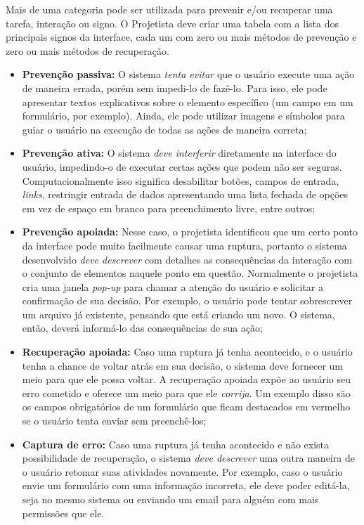 \indent Mais de uma categoria pode ser utilizada para prevenir e/ou recuperar uma tarefa, interação ou signo. O Projetista deve criar uma tabela com a lista dos principais signos da interface, cada um com zero ou mais métodos de prevenção e zero ou mais métodos de recuperação.

\begin{itemize}

\item \textbf{Prevenção passiva:} O sistema \textit{tenta evitar} que o usuário execute uma ação de maneira errada, porém sem impedi-lo de fazê-lo. Para isso, ele pode apresentar textos explicativos sobre o elemento específico (um campo em um formulário, por exemplo). Ainda, ele pode utilizar imagens e símbolos para guiar o usuário na execução de todas as ações de maneira correta;

\item \textbf{Prevenção ativa:} O sistema \textit{deve interferir} diretamente na interface do usuário, impedindo-o de executar certas ações que podem não ser seguras. Computacionalmente isso significa desabilitar botões, campos de entrada, \textit{links}, restringir entrada de dados apresentando uma lista fechada de opções em vez de espaço em branco para preenchimento livre, entre outros;

\item \textbf{Prevenção apoiada:} Nesse caso, o projetista identificou que um certo ponto da interface pode muito facilmente causar uma ruptura, portanto o sistema desenvolvido \textit{deve descrever} com detalhes as consequências da interação com o conjunto de elementos naquele ponto em questão. Normalmente o projetista cria uma janela \textit{pop-up} para chamar a atenção do usuário e solicitar a confirmação de sua decisão. Por exemplo, o usuário pode tentar sobrescrever um arquivo já existente, pensando que está criando um novo. O sistema, então, deverá informá-lo das consequências de sua ação;

\item \textbf{Recuperação apoiada:} Caso uma ruptura já tenha acontecido, e o usuário tenha a chance de voltar atrás em sua decisão, o sistema deve fornecer um meio para que ele possa voltar. A recuperação apoiada expõe ao usuário seu erro cometido e oferece um meio para que ele \textit{corrija}. Um exemplo disso são os campos obrigatórios de um formulário que ficam destacados em vermelho se o usuário tenta enviar sem preenchê-los;

\item \textbf{Captura de erro:} Caso uma ruptura já tenha acontecido e não exista possibilidade de recuperação, o sistema \textit{deve descrever} uma outra maneira de o usuário retomar suas atividades novamente. Por exemplo, caso o usuário envie um formulário com uma informação incorreta, ele deve poder editá-la, seja no mesmo sistema ou enviando um email para alguém com mais permissões que ele.
\end{itemize}


